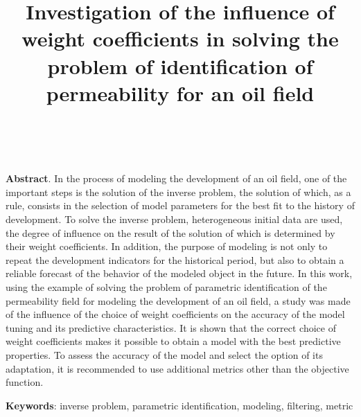 \documentclass[
11pt,%
tightenlines,%
twoside,%
onecolumn,%
nofloats,%
nobibnotes,%
nofootinbib,%
superscriptaddress,%
noshowpacs,%
centertags]%
{revtex4}
\begin{document}
	
	
	
	\title{Investigation of the influence of weight coefficients in solving the problem of identification of permeability for an oil field}
	
	\author{~}
	
	
	
	\maketitle
	\textbf{Abstract}. In the process of modeling the development of an oil field, one of the important steps is the solution of the inverse problem, the solution of which, as a rule, consists in the selection of model parameters for the best fit to the history of development. To solve the inverse problem, heterogeneous initial data are used, the degree of influence on the result of the solution of which is determined by their weight coefficients. In addition, the purpose of modeling is not only to repeat the development indicators for the historical period, but also to obtain a reliable forecast of the behavior of the modeled object in the future.
	In this work, using the example of solving the problem of parametric identification of the permeability field for modeling the development of an oil field, a study was made of the influence of the choice of weight coefficients on the accuracy of the model tuning and its predictive characteristics. It is shown that the correct choice of weight coefficients makes it possible to obtain a model with the best predictive properties. To assess the accuracy of the model and select the option of its adaptation, it is recommended to use additional metrics other than the objective function.

\textbf{Keywords}: inverse problem, parametric identification, modeling, filtering, metric
\end{document}
